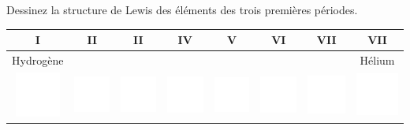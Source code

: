 \documentclass[
  11pt,
  french,
  a4paper,
  openany]{book}
\begin{document}
\begin{Exercise}
Dessinez la structure de Lewis des éléments des trois premières périodes.

\end{Exercise}

\begin{longtable}[]{@{}cccccccc@{}}
\toprule
I & II & II & IV & V & VI & VII & VII\tabularnewline
\midrule
\endhead
Hydrogène & & & & & & & Hélium\tabularnewline
\includegraphics[width=\textwidth,height=4em]{images/1px.png} & \includegraphics[width=\textwidth,height=4em]{images/1px.png} & \includegraphics[width=\textwidth,height=4em]{images/1px.png} & \includegraphics[width=\textwidth,height=4em]{images/1px.png} & \includegraphics[width=\textwidth,height=4em]{images/1px.png} & \includegraphics[width=\textwidth,height=4em]{images/1px.png} & \includegraphics[width=\textwidth,height=4em]{images/1px.png} & \includegraphics[width=\textwidth,height=4em]{images/1px.png}\tabularnewline

\end{longtable}
\end{document}
